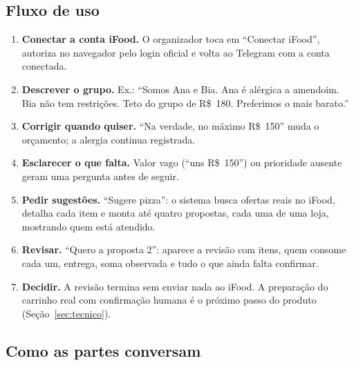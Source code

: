 \documentclass[11pt,a4paper]{article}
\newif\ifcenarioA
\begin{document}
\subsection{Fluxo de uso}
\begin{enumerate}
  \item \textbf{Conectar a conta iFood.} O organizador toca em ``Conectar iFood'', autoriza no navegador pelo login oficial e volta ao Telegram com a conta conectada.
  \item \textbf{Descrever o grupo.} Ex.: ``Somos Ana e Bia. Ana é alérgica a amendoim. Bia não tem restrições. Teto do grupo de R\$~180. Preferimos o mais barato.''
  \item \textbf{Corrigir quando quiser.} ``Na verdade, no máximo R\$~150'' muda o orçamento; a alergia continua registrada.
  \item \textbf{Esclarecer o que falta.} Valor vago (``uns R\$~150'') ou prioridade ausente geram uma pergunta antes de seguir.
  \item \textbf{Pedir sugestões.} ``Sugere pizza'': o sistema busca ofertas reais no iFood, detalha cada item e monta até quatro propostas, cada uma de uma loja, mostrando quem está atendido.
  \item \textbf{Revisar.} ``Quero a proposta 2'': aparece a revisão com itens, quem consome cada um, entrega, soma observada e tudo o que ainda falta confirmar.
\ifcenarioA
  \item \textbf{Confirmar e preparar o carrinho.} O organizador confirma aquela revisão específica; só então o sistema prepara o carrinho real no iFood. A confirmação vale uma única vez e perde a validade se qualquer item mudar.
  \item \textbf{Pedido e pagamento} continuam fora do sistema nesta etapa: o organizador finaliza no iFood se quiser.
\else
  \item \textbf{Decidir.} A revisão termina sem enviar nada ao iFood. A preparação do carrinho real com confirmação humana é o próximo passo do produto (Seção~\ref{sec:tecnico}).
\fi
\end{enumerate}

\subsection{Como as partes conversam}
\end{document}
